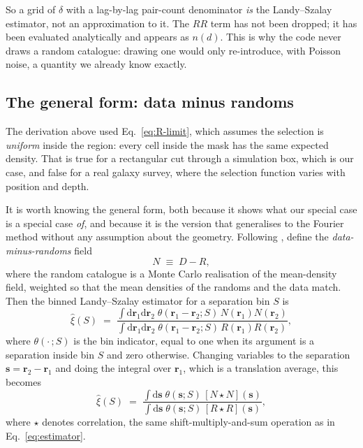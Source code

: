 \documentclass[12pt]{article}
\newcommand{\br}{\mathbf{r}}
\newcommand{\bs}{\mathbf{s}}
\newcommand{\corr}{\star}
\begin{document}
So a grid of $\delta$ with a lag-by-lag pair-count denominator \emph{is} the
Landy--Szalay estimator, not an approximation to it.  The $RR$ term has not
been dropped; it has been evaluated analytically and appears as $n(d)$.  This
is why the code never draws a random catalogue: drawing one would only
re-introduce, with Poisson noise, a quantity we already know exactly.

\subsection{The general form: data minus randoms}\label{sec:ls-general}

The derivation above used Eq.~\eqref{eq:R-limit}, which assumes the selection
is \emph{uniform} inside the region: every cell inside the mask has the same
expected density.  That is true for a rectangular cut through a simulation
box, which is our case, and false for a real galaxy survey, where the
selection function varies with position and depth.

It is worth knowing the general form, both because it shows what our special
case is a special case \emph{of}, and because it is the version that
generalises to the Fourier method without any assumption about the geometry.
Following \citet{Slepian2016}, define the \emph{data-minus-randoms} field
\begin{equation}\label{eq:N-field}
  N \;\equiv\; D - R ,
\end{equation}
where the random catalogue is a Monte Carlo realisation of the mean-density
field, weighted so that the mean densities of the randoms and the data match.
Then the binned Landy--Szalay estimator for a separation bin $S$ is
\begin{equation}\label{eq:ls-slepian}
  \hat\xi(S)
  \;=\; \frac{\int \mathrm{d}\br_1 \mathrm{d}\br_2\;
              \theta(\br_1 - \br_2; S)\, N(\br_1) N(\br_2)}
             {\int \mathrm{d}\br_1 \mathrm{d}\br_2\;
              \theta(\br_1 - \br_2; S)\, R(\br_1) R(\br_2)} ,
\end{equation}
where $\theta(\cdot\,; S)$ is the bin indicator, equal to one when its
argument is a separation inside bin $S$ and zero otherwise.  Changing
variables to the separation $\bs = \br_2 - \br_1$ and
doing the integral over $\br_1$, which is a translation average, this
becomes
\begin{equation}\label{eq:ls-convolution}
  \hat\xi(S) \;=\;
  \frac{\int \mathrm{d}\bs\; \theta(\bs; S)\, [N \corr N](\bs)}
       {\int \mathrm{d}\bs\; \theta(\bs; S)\, [R \corr R](\bs)} ,
\end{equation}
where $\corr$ denotes correlation, the same shift-multiply-and-sum operation
as in Eq.~\eqref{eq:estimator}.
\end{document}
